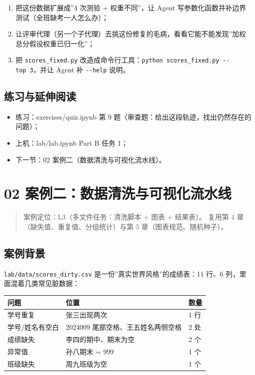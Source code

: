 \begin{enumerate}
\def\labelenumi{\arabic{enumi}.}
\tightlist
\item
  把这份数据扩展成''4 次测验 + 权重不同''，让 Agent
  写参数化函数并补边界测试（全班缺考一人怎么办）；
\item
  让评审代理（另一个子代理）去挑这份修复的毛病，看看它能不能发现''加权总分假设权重已归一化''；
\item
  把 \texttt{scores\_fixed.py}
  改造成命令行工具：\texttt{python\ scores\_fixed.py\ -\/-top\ 3}，并让
  Agent 补 \texttt{-\/-help} 说明。
\end{enumerate}

\subsection{练习与延伸阅读}\label{ux7ec3ux4e60ux4e0eux5ef6ux4f38ux9605ux8bfb-3}

\begin{itemize}
\tightlist
\item
  练习：exercises/quiz.ipynb 第 9
  题（审查题：给出这段轨迹，找出仍然存在的问题）；
\item
  上机：lab/lab.ipynb Part B 任务 1；
\item
  下一节：02 案例二（数据清洗与可视化流水线）。
\end{itemize}

\section{02
案例二：数据清洗与可视化流水线}\label{ux6848ux4f8bux4e8cux6570ux636eux6e05ux6d17ux4e0eux53efux89c6ux5316ux6d41ux6c34ux7ebf}

\begin{quote}
案例定位：L3（多文件任务：清洗脚本 + 图表 + 结果表）。 复用第 4
章（缺失值、重复值、分组统计）与第 5 章（图表规范、随机种子）。
\end{quote}

\subsection{案例背景}\label{ux6848ux4f8bux80ccux666f-5}

\texttt{lab/data/scores\_dirty.csv} 是一份''真实世界风格''的成绩表：11
行、6 列，里面混着几类常见脏数据：

{\def\LTcaptype{none} %
\begin{longtable}[]{@{}lll@{}}
\toprule\noalign{}
问题 & 位置 & 数量 \\
\midrule\noalign{}
\endhead
\bottomrule\noalign{}
\endlastfoot
学号重复 & 张三出现两次 & 1 行 \\
学号/姓名有空白 & 2024009 尾部空格、王五姓名两侧空格 & 2 处 \\
成绩缺失 & 李四的期中、期末为空 & 2 个 \\
异常值 & 孙八期末 = 999 & 1 个 \\
班级缺失 & 周九班级为空 & 1 个 \\
\end{longtable}
}

